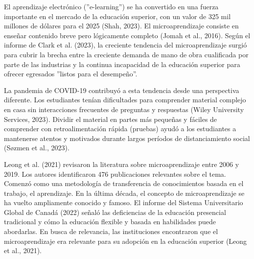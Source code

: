 
El aprendizaje electrónico (''e-learning'') se ha convertido en una fuerza importante en el
mercado de la educación superior, con un valor de 325 mil millones de dólares
para el 2025 (Shah, 2023). El microaprendizaje consiste en enseñar contenido breve
pero lógicamente completo (Jomah et al., 2016). Según el informe de Clark et al.
(2023), la creciente tendencia del microaprendizaje surgió para cubrir la brecha
entre la creciente demanda de mano de obra cualificada por parte de las
industrias y la continua incapacidad de la educación superior para ofrecer
egresados ''listos para el desempeño''.

La pandemia de COVID-19 contribuyó a esta tendencia desde una perspectiva
diferente. Los estudiantes tenían dificultades para comprender material complejo
en casa sin interacciones frecuentes de preguntas y respuestas (Wiley University
Services, 2023). Dividir el material en partes más pequeñas y fáciles de
comprender con retroalimentación rápida (pruebas) ayudó a los estudiantes a
mantenerse atentos y motivados durante largos períodos de distanciamiento social
(Søzmen et al., 2023).

Leong et al. (2021) revisaron la literatura sobre microaprendizaje entre 2006 y
2019. Los autores identificaron 476 publicaciones relevantes sobre el tema.
Comenzó como una metodología de transferencia de conocimientos basada en el
trabajo, el aprendizaje. En la última década, el concepto de microaprendizaje se
ha vuelto ampliamente conocido y famoso. El informe del Sistema Universitario
Global de Canadá (2022) señaló las deficiencias de la educación presencial
tradicional y cómo la educación flexible y basada en habilidades puede
abordarlas. En busca de relevancia, las instituciones encontraron que el
microaprendizaje era relevante para su adopción en la educación superior (Leong
et al., 2021).

